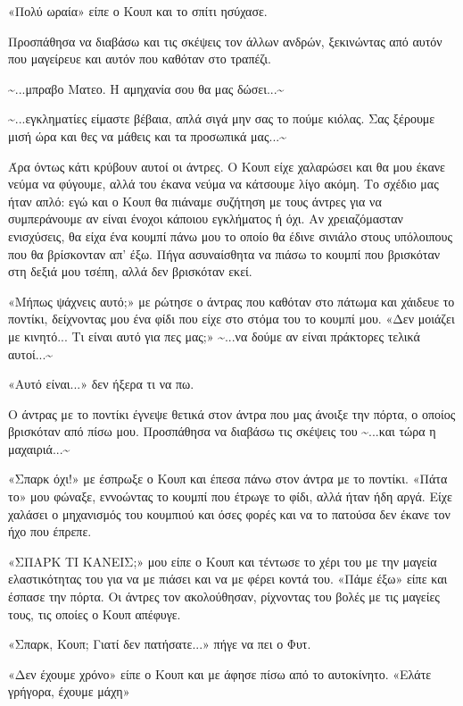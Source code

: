 \documentclass[12pt,twoside, openany]{book}
\begin{document}
«Πολύ ωραία» είπε ο Κουπ και το σπίτι ησύχασε.

Προσπάθησα  να διαβάσω και τις σκέψεις τον άλλων ανδρών, ξεκινώντας από αυτόν που μαγείρευε και αυτόν που καθόταν στο τραπέζι.

\textasciitilde ...μπραβο Ματεο. Η αμηχανία σου θα μας δώσει...\textasciitilde 

\textasciitilde ...εγκληματίες είμαστε βέβαια, απλά σιγά μην σας το πούμε κιόλας. Σας ξέρουμε μισή ώρα και θες να μάθεις και τα προσωπικά μας...\textasciitilde 

Άρα όντως κάτι κρύβουν αυτοί οι άντρες. Ο Κουπ είχε χαλαρώσει και θα μου έκανε νεύμα να φύγουμε, αλλά του έκανα νεύμα να κάτσουμε λίγο ακόμη. Το σχέδιο μας ήταν απλό: εγώ και ο Κουπ θα πιάναμε συζήτηση με τους άντρες για να συμπεράνουμε αν είναι ένοχοι κάποιου εγκλήματος ή όχι. Αν χρειαζόμασταν ενισχύσεις, θα είχα ένα κουμπί πάνω μου το οποίο θα έδινε σινιάλο στους υπόλοιπους που θα βρίσκονταν απ’ έξω. Πήγα ασυναίσθητα να πιάσω το κουμπί που βρισκόταν στη δεξιά μου τσέπη, αλλά δεν βρισκόταν εκεί.

«Μήπως ψάχνεις αυτό;» με ρώτησε ο άντρας που καθόταν στο πάτωμα και χάιδευε το ποντίκι, δείχνοντας μου ένα φίδι που είχε στο στόμα του το κουμπί μου. «Δεν μοιάζει με κινητό... Τι είναι αυτό για πες μας;» \textasciitilde ...να δούμε αν είναι πράκτορες τελικά αυτοί...\textasciitilde 

«Αυτό είναι...» δεν ήξερα τι να πω.

Ο άντρας με το ποντίκι έγνεψε θετικά στον άντρα που μας άνοιξε την πόρτα, ο οποίος βρισκόταν από πίσω μου. Προσπάθησα να διαβάσω τις σκέψεις του \textasciitilde ...και τώρα η μαχαιριά...\textasciitilde 

«Σπαρκ όχι!» με έσπρωξε ο Κουπ και έπεσα πάνω στον άντρα με το ποντίκι. «Πάτα το» μου φώναξε, εννοώντας το κουμπί που έτρωγε το φίδι, αλλά ήταν ήδη αργά. Είχε χαλάσει ο μηχανισμός του κουμπιού και όσες φορές και να το πατούσα δεν έκανε τον ήχο που έπρεπε.

«ΣΠΑΡΚ ΤΙ ΚΑΝΕΙΣ;» μου είπε ο Κουπ και τέντωσε το χέρι του με την μαγεία ελαστικότητας του για να με πιάσει και να με φέρει κοντά του. «Πάμε έξω» είπε και έσπασε την πόρτα. Οι άντρες τον ακολούθησαν, ρίχνοντας του βολές με τις μαγείες τους, τις οποίες ο Κουπ απέφυγε.

«Σπαρκ, Κουπ; Γιατί δεν πατήσατε...» πήγε να πει ο Φυτ.

«Δεν έχουμε χρόνο» είπε ο Κουπ και με άφησε πίσω από το αυτοκίνητο. «Ελάτε γρήγορα, έχουμε μάχη»
\end{document}
